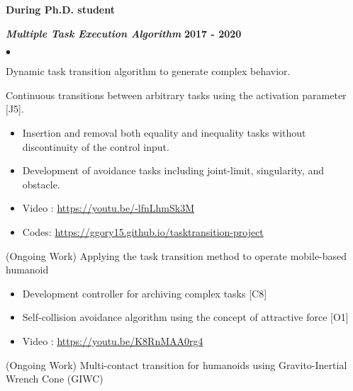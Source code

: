 \documentclass[margin,line]{res}
\newenvironment{list2}{
  \begin{list}{$\bullet$}{%
      \setlength{\itemsep}{0in}
      \setlength{\parsep}{0in} \setlength{\parskip}{0in}
      \setlength{\topsep}{0in} \setlength{\partopsep}{0in} 
      \setlength{\leftmargin}{0.2in}}}{\end{list}}
\begin{document}
\begin{resume}
  {\bf During Ph.D. student}

  \vspace{-.3cm}


  \textbf{\emph { Multiple Task Execution Algorithm}} \hfill  {\bf 2017  - 2020}
  \begin{list2}
    \item Dynamic task transition algorithm to generate complex behavior.
    \item Continuous transitions between arbitrary tasks using the activation parameter [J5].
    \begin{itemize}
      \vspace*{-.05in}
      \item[\checkmark] Insertion and removal both equality and inequality tasks without discontinuity of the control input.
            \vspace*{-.05in}
      \item[\checkmark] Development of avoidance tasks including joint-limit, singularity, and obstacle.
            \vspace*{-.05in}
      \item[\checkmark] Video : \url{https://youtu.be/-lfnLhmSk3M}
            \vspace*{-.05in}
      \item[\checkmark] Codes: \url{https://ggory15.github.io/tasktransition-project}
            \vspace*{-.05in}
    \end{itemize}
    \item (Ongoing Work) Applying the task transition method to operate mobile-based humanoid
    \begin{itemize}
      \vspace*{-.05in}
      \item[\checkmark] Development controller for archiving complex tasks [C8]
            \vspace*{-.05in}
      \item[\checkmark] Self-collision avoidance algorithm using the concept of attractive force [O1]
            \vspace*{-.05in}
      \item[\checkmark] Video : \url{https://youtu.be/K8RnMAA0rg4}
            \vspace*{-.05in}
    \end{itemize}
    \item (Ongoing Work) Multi-contact transition for humanoids using Gravito-Inertial Wrench Cone (GIWC)
  \end{list2}


\end{resume}
\end{document}

